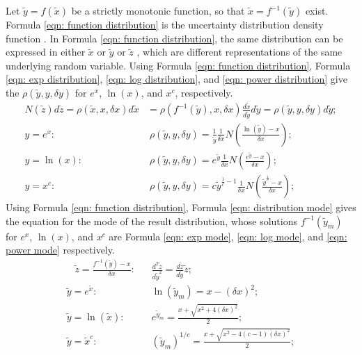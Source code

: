 \documentclass[twoside]{article}
\numberwithin{equation}{section}
\newcommand{\eqspace}{\;\;\;}
\begin{document}
Let $\tilde{y} = f(\tilde{x})$ be a strictly monotonic function, so that $\tilde{x} = f^{-1}(\tilde{y})$ exist.
Formula \eqref{eqn: function distribution} is the uncertainty distribution density function \cite{Statistical_Methods}.
In Formula \eqref{eqn: function distribution}, the same distribution can be expressed in either $\tilde{x}$ or $\tilde{y}$ or $\tilde{z}$ , which are different representations of the same underlying random variable.
Using Formula \eqref{eqn: function distribution}, Formula \eqref{eqn: exp distribution}, \eqref{eqn: log distribution}, and \eqref{eqn: power distribution} give the $\rho(\tilde{y}, y, \delta y)$ for $e^x$, $\ln(x)$, and $x^c$, respectively.
\begin{align}
\label{eqn: function distribution}
N(\tilde{z}) d \tilde{z} = \rho(\tilde{x}, x, \delta x) d\tilde{x} &= \rho(f^{-1}(\tilde{y}), x, \delta x) \frac{d\tilde{x}}{d\tilde{y}} d\tilde{y} 
= \rho(\tilde{y}, y, \delta y) d\tilde{y}; \\
\label{eqn: exp distribution}
y = e^x: &\; \rho(\tilde{y}, y, \delta y) = \frac{1}{\tilde{y}} \frac{1}{\delta x} N(\frac{\ln(\tilde{y}) - x}{\delta x}); \\
\label{eqn: log distribution}
y = \ln(x): &\; \rho(\tilde{y}, y, \delta y) = e^{\tilde{y}} \frac{1}{\delta x} N(\frac{e^{\tilde{y}} - x}{\delta x}); \\
\label{eqn: power distribution}
y = x^c: &\; \rho(\tilde{y}, y, \delta y) = c \tilde{y}^{\frac{1}{c}-1} \frac{1}{\delta x} N(\frac{\tilde{y}^\frac{1}{c} - x}{\delta x}); 
\end{align}
Using Formula \eqref{eqn: function distribution}, Formula \eqref{eqn: distribution mode} gives the equation for the mode of the result distribution, whose solutions $f^{-1}(\tilde{y}_m)$ for $e^x$, $\ln(x)$, and $x^c$ are Formula \eqref{eqn: exp mode}, \eqref{eqn: log mode}, and \eqref{eqn: power mode} respectively.
\begin{align}
\label{eqn: distribution mode}
\eqspace \tilde{z} = \frac{f^{-1}(\tilde{y}) - x}{\delta x}: &\eqspace \frac{d^2 \tilde{z}}{d \tilde{y}^2} = \frac{d \tilde{z}}{d \tilde{y}} \tilde{z}; \\
\label{eqn: exp mode}
\tilde{y} = e^{\tilde{x}}: &\eqspace \ln(\tilde{y}_m) = x - (\delta x)^2; \\
\label{eqn: log mode}
\tilde{y} = \ln(\tilde{x}): &\eqspace e^{\tilde{y}_m} = \frac{x + \sqrt{x^2 + 4 (\delta x)^2}}{2}; \\
\label{eqn: power mode}
\tilde{y} = \tilde{x}^c: &\eqspace (\tilde{y}_m)^{1/c} = \frac{x + \sqrt{x^2 - 4(c-1)(\delta x)^2}}{2};
\end{align}
\end{document}

